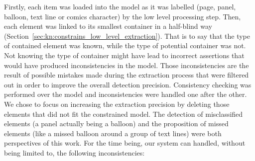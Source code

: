 Firstly, each item was loaded into the model as it was labelled (page, panel, balloon, text line or comics character) by the low level processing step.
Then, each element was linked to its smallest container in a half-blind way (Section~\ref{sec:kn:constrains_low_level_extraction}).
That is to say that the type of contained element was known, while the type of  potential container was not.
Not knowing the type of container might have lead to incorrect assertions that would have produced inconsistencies in the model.
Those inconsistencies are the result of possible mistakes made during the extraction process that were filtered out in order to improve the overall detection precision.
Consistency checking was performed over the model and inconsistencies were handled one after the other.
We chose to focus on increasing the extraction precision by deleting those elements that did not fit the constrained model.
The detection of misclassified elements (a panel actually being a balloon) and the proposition of missed elements (like a missed balloon around a group of text lines) were both perspectives of this work.
For the time being, our system can handled, without being limited to, the following inconsistencies:
